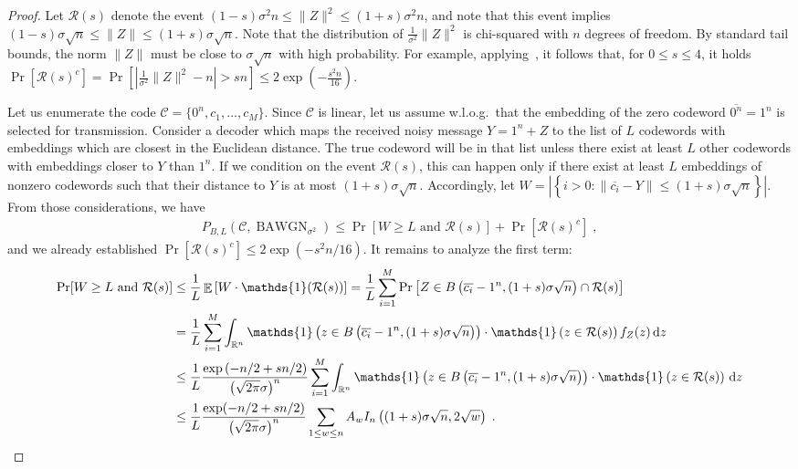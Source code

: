\documentclass{article}
\DeclareMathOperator*{\E}{\mathbb{E}}
\DeclareMathOperator{\BAWGN}{BAWGN}
\theoremstyle{plain}
\theoremstyle{plain}
\theoremstyle{plain}
\theoremstyle{plain}
\theoremstyle{plain}
\theoremstyle{plain}
\theoremstyle{plain}
\theoremstyle{plain}
\theoremstyle{plain}
\theoremstyle{plain}
\theoremstyle{remark}
\theoremstyle{remark}
\theoremstyle{remark}
\theoremstyle{plain}
\begin{document}
\begin{proof}
Let $\mathcal{R}(s)$ denote the event
$(1-s)\sigma^2 n\le \|Z\|^2\le (1+s)\sigma^2n$,
and note that this event implies
$(1-s)\sigma\sqrt{n}\le\|Z\|\le(1+s)\sigma\sqrt{n}$.
Note that the distribution of 
$\frac{1}{\sigma^2}\|Z\|^2$ is chi-squared with
$n$ degrees of freedom. By standard tail bounds, the norm $\|Z\|$ must be close to $\sigma\sqrt{n}$
with high probability. For example, applying~\cite[Lemma~1]{laurent2000adaptive}, it follows that, for $0\le s\le 4$, it holds
$\Pr[\mathcal{R}(s)^c]=\Pr\left[\left|\frac{1}{\sigma^2}\|Z\|^2-n\right|>
s n\right]\le 2\exp\left(-\frac{s^2n}{16}\right)$.

Let us enumerate the code $\mathcal{C}=\{0^n,c_1,\ldots,c_M\}$.
Since $\mathcal{C}$ is linear, let us
assume w.l.o.g.~that the embedding of the zero codeword
$\overline{0^n}=1^n$ is selected for transmission.
Consider a decoder which maps 
the received noisy message $Y=1^n+Z$ to the list
of $L$ codewords with embeddings which are closest in the Euclidean distance.
The true codeword will be in that list unless
there exist at least $L$ other codewords with
embeddings closer to $Y$ than $1^n$. If we condition on the event
$\mathcal{R}(s)$, this can happen only if there exist at
least $L$ embeddings of nonzero codewords
such that their distance
to $Y$ is at most $(1+s)\sigma\sqrt{n}$. Accordingly,
let $W=\left|\left\{i>0: \|\overline{c_i}-Y\|\le(1+s)\sigma\sqrt{n}\right\}\right|$. From those considerations, we have
\begin{align*}
P_{B,L}(\mathcal{C},\BAWGN_{\sigma^2})
\le \Pr[W\ge L\text{ and }\mathcal{R}(s)] + \Pr[\mathcal{R}(s)^c]\;,
\end{align*}
and we already established
$\Pr[\mathcal{R}(s)^c]\le
2\exp(-s^2n/16)$. It remains
to analyze the first term:
\begin{align*}
\Pr[W\ge L\text{ and }\mathcal{R}(s)]
&\le \frac{1}{L}\E\left[W \cdot \mathds{1}(\mathcal{R}(s))\right]
=\frac{1}{L}\sum_{i=1}^M \Pr\left[Z\in B\left(\overline{c_i}-1^n,(1+s)\sigma\sqrt{n}\right)\cap \mathcal{R}(s)\right]\\
&=\frac{1}{L}\sum_{i=1}^M\int_{\mathbb{R}^n}
\mathds{1}\left(z\in B\left(\overline{c_i}-1^n,(1+s)\sigma\sqrt{n}\right)\right)\cdot \mathds{1}\left(z\in\mathcal{R}(s)\right)
f_Z(z)\,\mathrm{d}z\\
&\le\frac{1}{L}
\frac{\exp\left(-n/2+sn/2\right)}{\left(\sqrt{2\pi}\sigma\right)^{n}}
\sum_{i=1}^M\int_{\mathbb{R}^n}
\mathds{1}\left(z\in B\left(\overline{c_i}-1^n,(1+s)\sigma\sqrt{n}\right)\right)\cdot 
\mathds{1}\left(z\in\mathcal{R}(s)\right)\,\mathrm{d}z
\\&\le\frac{1}{L} \frac{\exp(-n/2+sn/2)}{\left(\sqrt{2\pi}\sigma\right)^{n}}
\sum_{1\le w\le n}A_w I_n\left(
(1+s)\sigma\sqrt{n},2\sqrt{w}
\right)\;.\qedhere
\end{align*}
\end{proof}
\end{document}

